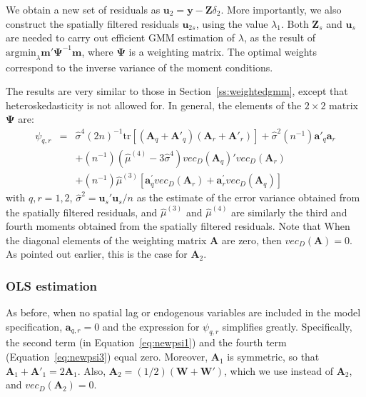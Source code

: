 \documentclass{article}
\begin{document}
We obtain a new set of residuals as $\mathbf{u}_2 = \mathbf{y} - \mathbf{Z} \delta_2$.
More importantly, we also construct the spatially filtered residuals $\mathbf{u}_{2s}$, using
the value $\lambda_1$. Both $\mathbf{Z}_s$ and $\mathbf{u}_s$ are needed to carry out
efficient GMM estimation of $\lambda$, as the result of 
 $\mbox{argmin}_\lambda \mathbf{m'}\mathbf{\mathbf{\Psi}}^{-1} \mathbf{m}$, where $\mathbf{\Psi}$ is a weighting matrix.
The optimal weights correspond to the inverse variance of the moment conditions.

The results are very similar to those in Section~\ref{ss:weightedgmm}, except that 
heteroskedasticity is not allowed for. In general, the elements of the $2 \times 2$ matrix $\mathbf{\Psi}$ are:
\begin{eqnarray}
\psi_{q,r} &=& \hat{\sigma}^4 (2n)^{-1} \mbox{tr} [ (\mathbf{A}_q + \mathbf{A'}_q )  (\mathbf{A}_r + \mathbf{A'}_r )] + \hat{\sigma}^2 (n^{-1}) \mathbf{a'}_q \mathbf{a}_r \label{eq:newpsi1}\\
&& + (n^{-1}) (\hat{\mu}^{(4)} - 3 \hat{\sigma}^4) vec_D(\mathbf{A}_q)'vec_D (\mathbf{A}_r)  \label{eq:newpsi2}\\
&& + (n^{-1}) \hat{\mu}^{(3)} [ \mathbf{a}_q^{'} vec_D(\mathbf{A}_r) +  \mathbf{a}_r^{'} vec_D(\mathbf{A}_q) ] \label{eq:newpsi3}
\end{eqnarray}
with $q, r = 1, 2$, $\hat{\sigma}^2 = \mathbf{u}_s'\mathbf{u}_s / n$ as the 
estimate of the error variance obtained from the spatially filtered residuals,
and $\hat{\mu}^{(3)}$ and $\hat{\mu}^{(4)}$ are similarly the third and fourth moments
obtained from the spatially filtered residuals. Note that When the diagonal elements of the weighting matrix $\mathbf{A}$ are zero, 
then  $vec_D (\mathbf{A}) = 0$. As pointed out earlier, this is the case for $\mathbf{A}_2$.




\subsubsection{OLS estimation}
As before, when no spatial lag or endogenous variables are included in the
model specification, $\mathbf{a}_{q,r} = 0$ and the expression for $\psi_{q,r}$ simplifies greatly.
Specifically, the second term (in Equation~\ref{eq:newpsi1}) and the fourth term (Equation~\ref{eq:newpsi3}) equal zero.
Moreover,
$\mathbf{A}_1$ is symmetric, so that $\mathbf{A}_1 + \mathbf{A'}_1 = 2 \mathbf{A}_1$.
Also, $\mathbf{A}_2 = (1/2) (\mathbf{W} + \mathbf{W'} )$, which we use instead of $\mathbf{A}_2$,
and $vec_D (\mathbf{A}_2) = 0$.
\end{document}
